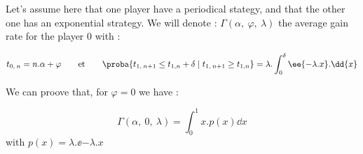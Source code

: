 Let's assume here that one player have a periodical stategy,
and that the other one has an exponential strategy.
We will denote :
$ \Gamma \left( \alpha,\:\varphi,\:\lambda \right) $
the average gain rate for the player 0 with :

\[t_{0,\:n}=n.\alpha+\varphi\qquad\text{et}\qquad
\proba{t_{1,\:n+1}\leq t_{1,n}+\delta\;|\;t_{1,\:n+1}\geq t_{1,n}}
  =\lambda.\int_0^\delta \ee{-\lambda.x}.\dd{x}\]


We can proove that, for $ \varphi = 0 $ we have :

\[ \Gamma \left( \alpha,\:0,\:\lambda \right) = \int_0^1x.p\left(x\right)\dd{x} \]
with $p\left(x\right) = \lambda.\ee{-\lambda.x} $